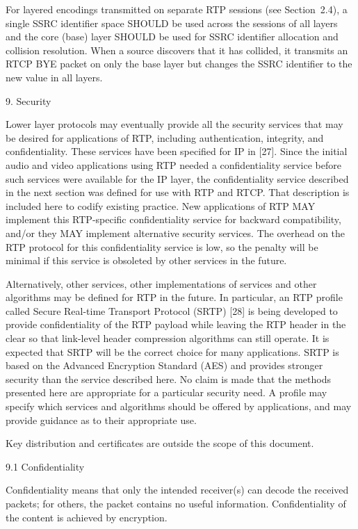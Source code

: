 \documentclass{article}
\begin{document}
For layered encodings transmitted on separate RTP sessions (see Section~2.4), a single SSRC identifier space SHOULD be used across the sessions of all layers and the core (base) layer SHOULD be used for SSRC identifier allocation and collision resolution.  When a source discovers that it has collided, it transmits an RTCP BYE packet on only the base layer but changes the SSRC identifier to the new value in all layers.

9. Security

Lower layer protocols may eventually provide all the security services that may be desired for applications of RTP, including authentication, integrity, and confidentiality.  These services have been specified for IP in [27].  Since the initial audio and video applications using RTP needed a confidentiality service before such services were available for the IP layer, the confidentiality service described in the next section was defined for use with RTP and RTCP. That description is included here to codify existing practice.  New applications of RTP MAY implement this RTP-specific confidentiality service for backward compatibility, and/or they MAY implement alternative security services.  The overhead on the RTP protocol for this confidentiality service is low, so the penalty will be minimal if this service is obsoleted by other services in the future.

Alternatively, other services, other implementations of services and other algorithms may be defined for RTP in the future.  In particular, an RTP profile called Secure Real-time Transport Protocol (SRTP) [28] is being developed to provide confidentiality of the RTP payload while leaving the RTP header in the clear so that link-level header compression algorithms can still operate.  It is expected that SRTP will be the correct choice for many applications.  SRTP is based on the Advanced Encryption Standard (AES) and provides stronger security than the service described here.  No claim is made that the methods presented here are appropriate for a particular security need.  A profile may specify which services and algorithms should be offered by applications, and may provide guidance as to their appropriate use.

Key distribution and certificates are outside the scope of this document.

9.1 Confidentiality

Confidentiality means that only the intended receiver(s) can decode the received packets; for others, the packet contains no useful information.  Confidentiality of the content is achieved by encryption.
\end{document}
